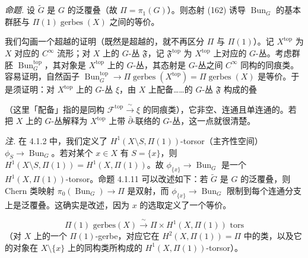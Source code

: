  \emph{命题.} 设 $\tilde G$ 是 $G$ 的泛覆叠（故 $\Pi=\pi_1(G)$）。则态射 (162) 诱导 $\operatorname{Bun}_G$ 的基本群胚与 $\Pi(1)\operatorname{gerbes}(X)$ 之间的等价。

我们勾画一个超越的证明（既然是超越的，就不再区分 $\Pi$ 与 $\Pi(1)$）。记 $X^{\mathrm{top}}$ 为 $X$ 对应的 $C^\infty$ 流形；对 $X$ 上的 $G$-丛 $\mathfrak{F}$，记 $\mathfrak{F}^{\mathrm{top}}$ 为 $X^{\mathrm{top}}$ 上对应的 $G$-丛。考虑群胚 $\operatorname{Bun}_G^{\mathrm{top}}$，其对象是 $X^{\mathrm{top}}$ 上的 $G$-丛，其态射是 $G$-丛之间 $C^\infty$ 同构的同痕类。容易证明，自然函子 $\operatorname{Bun}_G^{\mathrm{top}}\to\Pi\operatorname{gerbes}(X^{\mathrm{top}})=\Pi\operatorname{gerbes}(X)$ 是等价。于是须证明：对 $X^{\mathrm{top}}$ 上的 $G$-丛 $\xi$，由 $X$ 上配备……的 $G$-丛 $\mathfrak{F}$ 构成的叠

（这里「配备」指的是同构 $\mathcal{F}^{\mathrm{top}}\xrightarrow{\ \sim\ }\xi$ 的同痕类），它非空、连通且单连通的。若把 $X$ 上的 $G$-丛解释为 $X^{\mathrm{top}}$ 上带 $\bar\partial$-联络的 $G$-丛，这一点就很清楚。

\emph{注.} 在 4.1.2 中，我们定义了 $H^{1}(X\setminus S,\Pi(1))$-torsor（主齐性空间）$\phi_{S}\to\operatorname{Bun}_{G}$。若对某个 $x\in X$ 有 $S=\{x\}$，则 $H^{1}(X\setminus S,\Pi(1))=H^{1}(X,\Pi(1))$。故 $\phi_{\{x\}}\to\operatorname{Bun}_{G}$ 是一个 $H^{1}(X,\Pi(1))$-torsor。命题 4.1.11 可以改述如下：若 $\tilde{G}$ 是 $G$ 的泛覆叠，则 Chern 类映射 $\pi_{0}(\operatorname{Bun}_{G})\to\Pi$ 是双射，而 $\phi_{\{x\}}\to\operatorname{Bun}_{G}$ 限制到每个连通分支上是泛覆叠。这确实是改述，因为 $x$ 的选取定义了一个等价。

\begin{equation}\tag{163}
\Pi(1)\text{ gerbes}(X)\xrightarrow{\ \sim\ }\Pi\times H^{1}(X,\Pi(1))\text{ tors}
\end{equation}
（对 $X$ 上的一个 $\Pi(1)$-gerbe，对应它在 $H^{2}(X,\Pi(1))=\Pi$ 中的类，以及它的对象在 $X\setminus\{x\}$ 上的同构类所构成的 $H^{1}(X,\Pi(1))$-torsor）。

